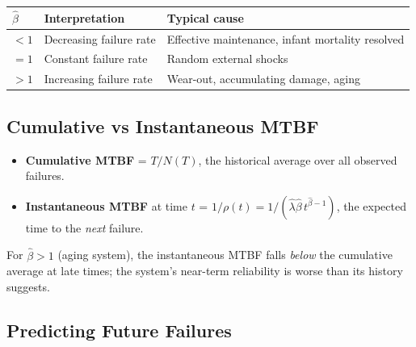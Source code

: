 \documentclass[
  letterpaper,
  DIV=11,
  numbers=noendperiod]{scrreprt}
\newcounter{none} %
\providecommand{\tightlist}{%
  \setlength{\itemsep}{0pt}\setlength{\parskip}{0pt}}
\begin{document}
{\def\LTcaptype{none} %
\begin{longtable}[]{@{}
  >{\centering\arraybackslash}p{}
  >{\raggedright\arraybackslash}p{}
  >{\raggedright\arraybackslash}p{}@{}}
\toprule\noalign{}
\begin{minipage}[b]{\linewidth}\centering
\(\hat{\beta}\)
\end{minipage} & \begin{minipage}[b]{\linewidth}\raggedright
Interpretation
\end{minipage} & \begin{minipage}[b]{\linewidth}\raggedright
Typical cause
\end{minipage} \\
\midrule\noalign{}
\endhead
\bottomrule\noalign{}
\endlastfoot
\(< 1\) & Decreasing failure rate & Effective maintenance, infant
mortality resolved \\
\(= 1\) & Constant failure rate & Random external shocks \\
\(> 1\) & Increasing failure rate & Wear-out, accumulating damage,
aging \\
\end{longtable}
}

\subsection{Cumulative vs Instantaneous
MTBF}\label{cumulative-vs-instantaneous-mtbf}

\begin{itemize}
\tightlist
\item
  \textbf{Cumulative MTBF} = \(T / N(T)\), the historical average over
  all observed failures.
\item
  \textbf{Instantaneous MTBF} at time \(t\) =
  \(1/\rho(t) = 1/(\hat{\lambda}\hat{\beta}\,t^{\hat{\beta}-1})\), the
  expected time to the \emph{next} failure.
\end{itemize}

For \(\hat{\beta} > 1\) (aging system), the instantaneous MTBF falls
\emph{below} the cumulative average at late times; the system's
near-term reliability is worse than its history suggests.

\subsection{Predicting Future
Failures}\label{predicting-future-failures}
\end{document}
